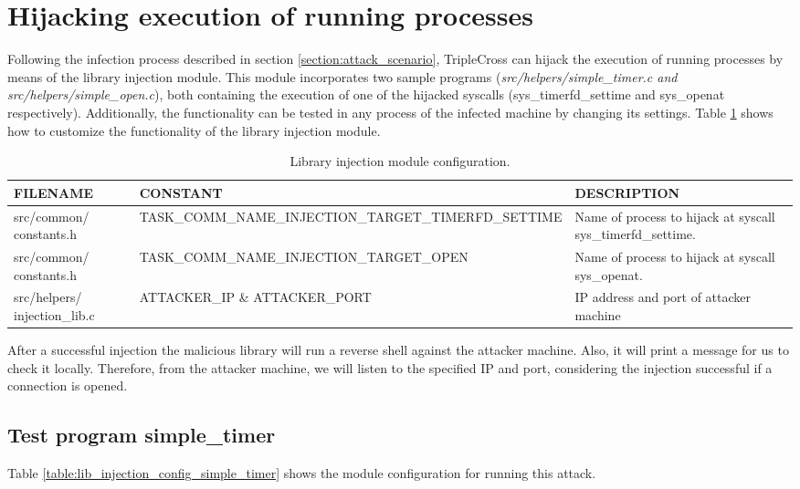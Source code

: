 \section{Hijacking execution of running processes}
Following the infection process described in section \ref{section:attack_scenario}, TripleCross can hijack the execution of running processes by means of the library injection module. This module incorporates two sample programs (\textit{src/helpers/simple\_timer.c and src/helpers/simple\_open.c}), both containing the execution of one of the hijacked syscalls (sys\_timerfd\_settime and sys\_openat respectively). Additionally, the functionality can be tested in any process of the infected machine by changing its settings. Table \ref{table:lib_injection_config} shows how to customize the functionality of the library injection module.

\begin{table}[htbp]
\begin{tabular}{|>{\centering\arraybackslash}p{3cm}|>{\centering\arraybackslash}p{5.5cm}|>{\centering\arraybackslash}p{5.5cm}|}
\hline
\textbf{FILENAME} & \textbf{CONSTANT} & \textbf{DESCRIPTION}\\
\hline
\hline
src/common/ constants.h & TASK\_COMM\_NAME\_INJECTION\_TARGET\_TIMERFD\_SETTIME & Name of process to hijack at syscall sys\_timerfd\_settime.\\
\hline
src/common/ constants.h & TASK\_COMM\_NAME\_INJECTION\_TARGET\_OPEN & Name of process to hijack at syscall sys\_openat.\\
\hline
src/helpers/ injection\_lib.c & ATTACKER\_IP \& ATTACKER\_PORT & IP address and port of attacker machine\\
\hline
\end{tabular}
\caption{Library injection module configuration.}
\label{table:lib_injection_config}
\end{table}

After a successful injection the malicious library will run a reverse shell against the attacker machine. Also, it will print a message for us to check it locally. Therefore, from the attacker machine, we will listen to the specified IP and port, considering the injection successful if a connection is opened.


\subsection{Test program simple\_timer}
Table \ref{table:lib_injection_config_simple_timer} shows the module configuration for running this attack.


